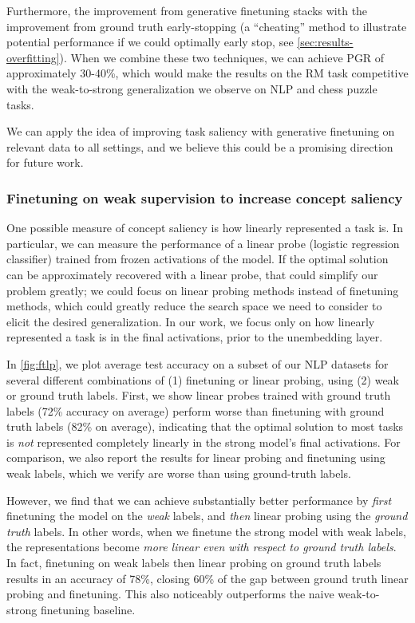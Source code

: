 Furthermore, the improvement from generative finetuning stacks with the improvement from ground truth early-stopping (a ``cheating'' method to illustrate potential performance if we could optimally early stop, see \ref{sec:results-overfitting}).
When we combine these two techniques, we can achieve PGR of approximately 30-40\%, which would make the results on the RM task competitive with the weak-to-strong generalization we observe on NLP and chess puzzle tasks.

We can apply the idea of improving task saliency with generative finetuning on relevant data to all settings, and we believe this could be a promising direction for future work.

\subsubsection{Finetuning on weak supervision to increase concept saliency}

One possible measure of concept saliency is how linearly represented a task is.  In particular, we can measure the performance of a linear probe (logistic regression classifier) trained from frozen activations of the model. If the optimal solution can be approximately recovered with a linear probe, that could simplify our problem greatly; we could focus on linear probing methods instead of finetuning methods, which could greatly reduce the search space we need to consider to elicit the desired generalization.  In our work, we focus only on how linearly represented a task is in the final activations, prior to the unembedding layer.

In \ref{fig:ftlp}, we plot average test accuracy on a subset of our NLP datasets for several different combinations of (1) finetuning or linear probing, using (2) weak or ground truth labels. First, we show linear probes trained with ground truth labels (72\% accuracy on average) perform worse than finetuning with ground truth labels (82\% on average), indicating that the optimal solution to most tasks is \textit{not} represented completely linearly in the strong model's final activations. For comparison, we also report the results for linear probing and finetuning using weak labels, which we verify are worse than using ground-truth labels. 

However, we find that we can achieve substantially better performance by \textit{first} finetuning the model on the \textit{weak} labels, and \textit{then} linear probing using the \textit{ground truth} labels. In other words, when we finetune the strong model with weak labels, the representations become \textit{more linear even with respect to ground truth labels}. In fact, finetuning on weak labels then linear probing on ground truth labels results in an accuracy of 78\%, closing 60\% of the gap between ground truth linear probing and finetuning. This also noticeably outperforms the naive weak-to-strong finetuning baseline.

